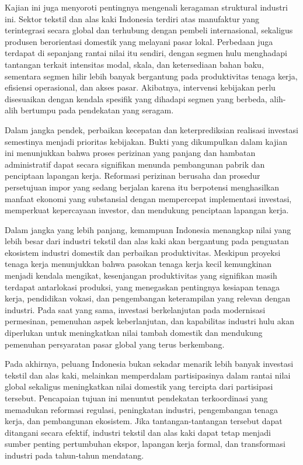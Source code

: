 \documentclass[
  manuscript=article,
  layout=publish,
  year=2026,
  volume=1,
]{den}
\begin{document}
Kajian ini juga menyoroti pentingnya mengenali keragaman struktural
industri ini. Sektor tekstil dan alas kaki Indonesia terdiri atas
manufaktur yang terintegrasi secara global dan terhubung dengan pembeli
internasional, sekaligus produsen berorientasi domestik yang melayani
pasar lokal. Perbedaan juga terdapat di sepanjang rantai nilai itu
sendiri, dengan segmen hulu menghadapi tantangan terkait intensitas
modal, skala, dan ketersediaan bahan baku, sementara segmen hilir lebih
banyak bergantung pada produktivitas tenaga kerja, efisiensi
operasional, dan akses pasar. Akibatnya, intervensi kebijakan perlu
disesuaikan dengan kendala spesifik yang dihadapi segmen yang berbeda,
alih-alih bertumpu pada pendekatan yang seragam.

Dalam jangka pendek, perbaikan kecepatan dan keterprediksian realisasi
investasi semestinya menjadi prioritas kebijakan. Bukti yang dikumpulkan
dalam kajian ini menunjukkan bahwa proses perizinan yang panjang dan
hambatan administratif dapat secara signifikan menunda pembangunan
pabrik dan penciptaan lapangan kerja. Reformasi perizinan berusaha dan
prosedur persetujuan impor yang sedang berjalan karena itu berpotensi
menghasilkan manfaat ekonomi yang substansial dengan mempercepat
implementasi investasi, memperkuat kepercayaan investor, dan mendukung
penciptaan lapangan kerja.

Dalam jangka yang lebih panjang, kemampuan Indonesia menangkap nilai
yang lebih besar dari industri tekstil dan alas kaki akan bergantung
pada penguatan ekosistem industri domestik dan perbaikan produktivitas.
Meskipun proyeksi tenaga kerja menunjukkan bahwa pasokan tenaga kerja
kecil kemungkinan menjadi kendala mengikat, kesenjangan produktivitas
yang signifikan masih terdapat antarlokasi produksi, yang menegaskan
pentingnya kesiapan tenaga kerja, pendidikan vokasi, dan pengembangan
keterampilan yang relevan dengan industri. Pada saat yang sama,
investasi berkelanjutan pada modernisasi permesinan, pemenuhan aspek
keberlanjutan, dan kapabilitas industri hulu akan diperlukan untuk
meningkatkan nilai tambah domestik dan mendukung pemenuhan persyaratan
pasar global yang terus berkembang.

Pada akhirnya, peluang Indonesia bukan sekadar menarik lebih banyak
investasi tekstil dan alas kaki, melainkan memperdalam partisipasinya
dalam rantai nilai global sekaligus meningkatkan nilai domestik yang
tercipta dari partisipasi tersebut. Pencapaian tujuan ini menuntut
pendekatan terkoordinasi yang memadukan reformasi regulasi, peningkatan
industri, pengembangan tenaga kerja, dan pembangunan ekosistem. Jika
tantangan-tantangan tersebut dapat ditangani secara efektif, industri
tekstil dan alas kaki dapat tetap menjadi sumber penting pertumbuhan
ekspor, lapangan kerja formal, dan transformasi industri pada
tahun-tahun mendatang.
\end{document}
